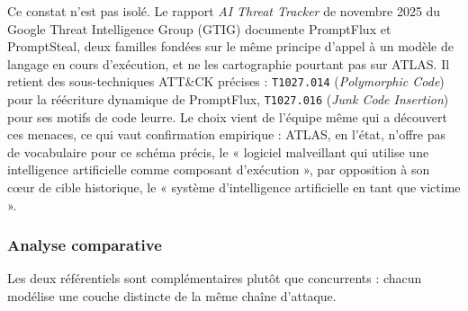 Ce constat n'est pas isolé. Le rapport \emph{AI Threat Tracker} de novembre 2025 du
Google Threat Intelligence Group (GTIG) documente PromptFlux et PromptSteal, deux familles
fondées sur le même principe d'appel à un modèle de langage en cours d'exécution, et ne
les cartographie pourtant pas sur ATLAS. Il retient des sous-techniques ATT\&CK précises :
\texttt{T1027.014} (\emph{Polymorphic Code}) pour la réécriture dynamique de PromptFlux,
\texttt{T1027.016} (\emph{Junk Code Insertion}) pour ses motifs de code leurre. Le choix
vient de l'équipe même qui a découvert ces menaces, ce qui vaut confirmation empirique :
ATLAS, en l'état, n'offre pas de vocabulaire pour ce schéma précis, le « logiciel
malveillant qui utilise une intelligence artificielle comme composant d'exécution », par
opposition à son cœur de cible historique, le « système d'intelligence artificielle en
tant que victime ».

\subsubsection{Analyse comparative}

Les deux référentiels sont complémentaires plutôt que concurrents : chacun modélise une
couche distincte de la même chaîne d'attaque.

